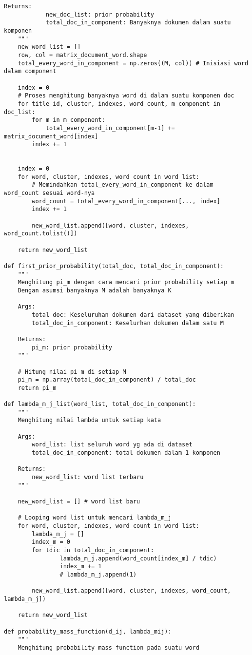 \begin{lstlisting}[breaklines=true]
	Returns:
			new_doc_list: prior probability
			total_doc_in_component: Banyaknya dokumen dalam suatu komponen
	"""
	new_word_list = []
	row, col = matrix_document_word.shape
	total_every_word_in_component = np.zeros((M, col)) # Inisiasi word dalam component
	
	index = 0
	# Proses menghitung banyaknya word di dalam suatu komponen doc
	for title_id, cluster, indexes, word_count, m_component in doc_list:
		for m in m_component:
			total_every_word_in_component[m-1] += matrix_document_word[index]
		index += 1
	

	index = 0
	for word, cluster, indexes, word_count in word_list:
		# Memindahkan total_every_word_in_component ke dalam word_count sesuai word-nya
		word_count = total_every_word_in_component[..., index]
		index += 1
		
		new_word_list.append([word, cluster, indexes, word_count.tolist()])

	return new_word_list

def first_prior_probability(total_doc, total_doc_in_component):
	"""
	Menghitung pi_m dengan cara mencari prior probability setiap m
	Dengan asumsi banyaknya M adalah banyaknya K

	Args:
		total_doc: Keseluruhan dokumen dari dataset yang diberikan
		total_doc_in_component: Keselurhan dokumen dalam satu M

	Returns:
		pi_m: prior probability
	"""
	
	# Hitung nilai pi_m di setiap M
	pi_m = np.array(total_doc_in_component) / total_doc
	return pi_m

def lambda_m_j_list(word_list, total_doc_in_component):
	"""
	Menghitung nilai lambda untuk setiap kata

	Args:
		word_list: list seluruh word yg ada di dataset
		total_doc_in_component: total dokumen dalam 1 komponen

	Returns:
		new_word_list: word list terbaru
	"""
	
	new_word_list = [] # word list baru
	
	# Looping word list untuk mencari lambda_m_j
	for word, cluster, indexes, word_count in word_list:
		lambda_m_j = []
		index_m = 0
		for tdic in total_doc_in_component:
				lambda_m_j.append(word_count[index_m] / tdic)
				index_m += 1 
				# lambda_m_j.append(1)
		
		new_word_list.append([word, cluster, indexes, word_count, lambda_m_j])
	
	return new_word_list

def probability_mass_function(d_ij, lambda_mij):
	"""
	Menghitung probability mass function pada suatu word


\end{lstlisting}
